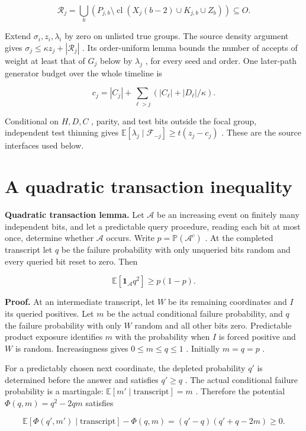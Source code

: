\documentclass[11pt]{article}
\begin{document}
\[\mathcal R_j=\bigcup_b\left(P_{j,b}\setminus
 \operatorname{cl}(X_j(b-2)\cup K_{j,b}\cup Z_b)\right)\subseteq O.\]

Extend \(\sigma_i,z_i,\lambda_i\) by zero on unlisted true groups. The source density argument gives \(\sigma_j\le\kappa z_j+|\mathcal R_j|\) . Its order-uniform lemma bounds the number of accepts of weight at least that of \(G_j\) below by \(\lambda_j\) , for every seed and order. One later-path generator budget over the whole timeline is

\[c_j=|C_j|+\sum_{\ell>j}(|C_\ell|+|D_\ell|/\kappa).\]

Conditional on \(H,D,C\) , parity, and test bits outside the focal group, independent test thinning gives \(\mathbb{E}[\lambda_j\mid\mathcal F_{-j}] \ge t(z_j-c_j)\) . These are the source interfaces used below.

\section{A quadratic transaction inequality}\label{a-quadratic-transaction-inequality}

\textbf{Quadratic transaction lemma.} Let \(\mathcal A\) be an increasing event on finitely many independent bits, and let a predictable query procedure, reading each bit at most once, determine whether \(\mathcal A\) occurs. Write \(p=\mathbb{P}(\mathcal A^c)\) . At the completed transcript let \(q\) be the failure probability with only unqueried bits random and every queried bit reset to zero. Then

\[\mathbb{E}[\mathbf 1_{\mathcal A}q^2]\ge p(1-p).\]

\textbf{Proof.} At an intermediate transcript, let \(W\) be its remaining coordinates and \(I\) its queried positives. Let \(m\) be the actual conditional failure probability, and \(q\) the failure probability with only \(W\) random and all other bits zero. Predictable product exposure identifies \(m\) with the probability when \(I\) is forced positive and \(W\) is random. Increasingness gives \(0\le m\le q\le1\) . Initially \(m=q=p\) .

For a predictably chosen next coordinate, the depleted probability \(q'\) is determined before the answer and satisfies \(q'\ge q\) . The actual conditional failure probability is a martingale: \(\mathbb{E}[m'\mid\text{transcript}]=m\) . Therefore the potential \(\Phi(q,m)=q^2-2qm\) satisfies

\[\mathbb{E}[\Phi(q',m')\mid\text{transcript}]-\Phi(q,m)
 =(q'-q)(q'+q-2m)\ge0.\]
\end{document}
